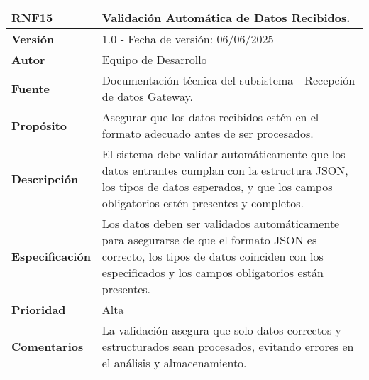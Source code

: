 \begin{longtable}{|l|p{12cm}|}
\hline
\textbf{RNF15} & \textbf{Validación Automática de Datos Recibidos.} \\
\hline
\endfirsthead
\hline
\textbf{Versión} & 1.0 - Fecha de versión: 06/06/2025 \\
\hline
\textbf{Autor} & Equipo de Desarrollo \\
\hline
\textbf{Fuente} & Documentación técnica del subsistema - Recepción de datos Gateway. \\
\hline
\textbf{Propósito} & Asegurar que los datos recibidos estén en el formato adecuado antes de ser procesados. \\
\hline
\textbf{Descripción} & El sistema debe validar automáticamente que los datos entrantes cumplan con la estructura JSON, los tipos de datos esperados, y que los campos obligatorios estén presentes y completos. \\
\hline
\textbf{Especificación} & Los datos deben ser validados automáticamente para asegurarse de que el formato JSON es correcto, los tipos de datos coinciden con los especificados y los campos obligatorios están presentes. \\
\hline
\textbf{Prioridad} & Alta \\
\hline
\textbf{Comentarios} & La validación asegura que solo datos correctos y estructurados sean procesados, evitando errores en el análisis y almacenamiento. \\
\hline
\end{longtable}

